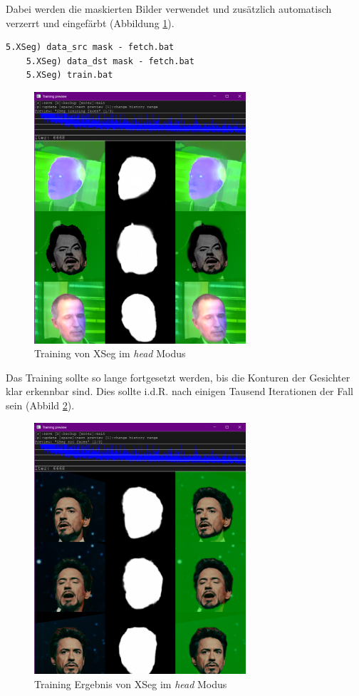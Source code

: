 Dabei werden die maskierten Bilder verwendet und zusätzlich automatisch verzerrt und eingefärbt (Abbildung \ref{fig:xseg-train}).
\begin{lstlisting}[label={lst:extraction-7},numbers=none]
    5.XSeg) data_src mask - fetch.bat
    5.XSeg) data_dst mask - fetch.bat
    5.XSeg) train.bat
\end{lstlisting}
\begin{figure}
    \center
    \includegraphics[width=0.7\textwidth]{Bilder/DFL/XSegEditor-4-train-1}
    \caption{Training von XSeg im \textit{head} Modus}
    \label{fig:xseg-train}
\end{figure}

Das Training sollte so lange fortgesetzt werden, bis die Konturen der Gesichter klar erkennbar sind.
Dies sollte i.d.R. nach einigen Tausend Iterationen der Fall sein (Abbild \ref{fig:xseg-train-result}).

\begin{figure}
    \center
    \includegraphics[width=0.7\textwidth]{Bilder/DFL/XSegEditor-4-train-3}
    \caption{Training Ergebnis von XSeg im \textit{head} Modus}
    \label{fig:xseg-train-result}
\end{figure}

